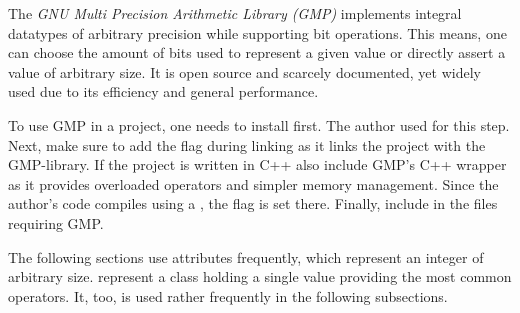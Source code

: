 \label{sub:approachGMP}
The \textit{GNU Multi Precision Arithmetic Library (GMP)} implements integral datatypes of arbitrary precision while supporting bit operations.
This means, one can choose the amount of bits used to represent a given value or directly assert a value of arbitrary size.
It is open source and scarcely documented, yet widely used due to its efficiency and general performance.

To use GMP in a project, one needs to install  first.
The author used  for this step.
Next, make sure to add the  flag during linking as it links the project with the GMP-library.
If the project is written in C++ also include GMP's C++ wrapper  as it provides overloaded operators and simpler memory management.
Since the author's code compiles using a , the flag is set there.
Finally, include  in the files requiring GMP.

The following sections use  attributes frequently, which represent an integer of arbitrary size.
 represent a class holding a single  value providing the most common operators.
It, too, is used rather frequently in the following subsections.

